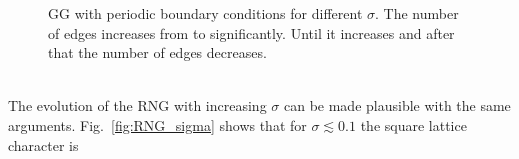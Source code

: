 \begin{figure}[htb]

            \caption[Examples of GG for different $\sigma$]
            {
                GG with periodic boundary conditions for different \(\sigma\).
                The number of edges increases from 
                to  significantly. Until 
                it increases and after that the number of edges decreases.
            }
            \label{fig:GG_sigma}
        \end{figure}\\
        The evolution of the RNG with increasing \(\sigma\) can be made plausible
        with the same arguments. Fig.\ \ref{fig:RNG_sigma}
        shows that for \(\sigma \lesssim 0.1\) the square lattice character is
